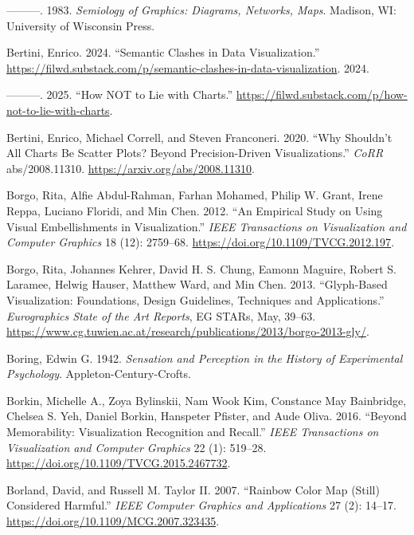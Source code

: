 \documentclass[
  letterpaper,
  DIV=11,
  numbers=noendperiod]{scrreprt}
\newlength{\cslhangindent}
\newenvironment{CSLReferences}[2] %
 {\begin{list}{}{%
  \setlength{\itemindent}{0pt}
  \setlength{\leftmargin}{0pt}
  \setlength{\parsep}{0pt}
  \ifodd #1
   \setlength{\leftmargin}{\cslhangindent}
   \setlength{\itemindent}{-1\cslhangindent}
  \fi
  \setlength{\itemsep}{#2\baselineskip}}}
 {\end{list}}
\begin{document}
\begin{CSLReferences}{1}{0}
---------. 1983. \emph{Semiology of Graphics: Diagrams, Networks, Maps}.
Madison, WI: University of Wisconsin Press.

Bertini, Enrico. 2024. {``Semantic Clashes in Data Visualization.''}
\url{https://filwd.substack.com/p/semantic-clashes-in-data-visualization}.
2024.

---------. 2025. {``How NOT to Lie with Charts.''}
\url{https://filwd.substack.com/p/how-not-to-lie-with-charts}.

Bertini, Enrico, Michael Correll, and Steven Franconeri. 2020. {``Why
Shouldn't All Charts Be Scatter Plots? Beyond Precision-Driven
Visualizations.''} \emph{CoRR} abs/2008.11310.
\url{https://arxiv.org/abs/2008.11310}.

Borgo, Rita, Alfie Abdul-Rahman, Farhan Mohamed, Philip W. Grant, Irene
Reppa, Luciano Floridi, and Min Chen. 2012. {``An Empirical Study on
Using Visual Embellishments in Visualization.''} \emph{IEEE Transactions
on Visualization and Computer Graphics} 18 (12): 2759--68.
\url{https://doi.org/10.1109/TVCG.2012.197}.

Borgo, Rita, Johannes Kehrer, David H. S. Chung, Eamonn Maguire, Robert
S. Laramee, Helwig Hauser, Matthew Ward, and Min Chen. 2013.
{``Glyph-Based Visualization: Foundations, Design Guidelines, Techniques
and Applications.''} \emph{Eurographics State of the Art Reports}, EG
STARs, May, 39--63.
\url{https://www.cg.tuwien.ac.at/research/publications/2013/borgo-2013-gly/}.

Boring, Edwin G. 1942. \emph{Sensation and Perception in the History of
Experimental Psychology}. Appleton-Century-Crofts.

Borkin, Michelle A., Zoya Bylinskii, Nam Wook Kim, Constance May
Bainbridge, Chelsea S. Yeh, Daniel Borkin, Hanspeter Pfister, and Aude
Oliva. 2016. {``Beyond Memorability: Visualization Recognition and
Recall.''} \emph{IEEE Transactions on Visualization and Computer
Graphics} 22 (1): 519--28.
\url{https://doi.org/10.1109/TVCG.2015.2467732}.

Borland, David, and Russell M. Taylor II. 2007. {``Rainbow Color Map
(Still) Considered Harmful.''} \emph{IEEE Computer Graphics and
Applications} 27 (2): 14--17.
\url{https://doi.org/10.1109/MCG.2007.323435}.


\end{CSLReferences}
\end{document}
